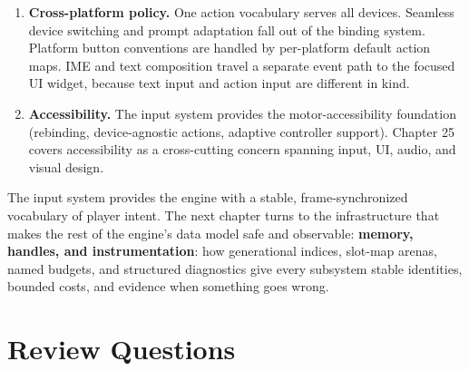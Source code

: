 \documentclass[
  11pt,
  letterpaper,
  DIV=11,
  numbers=noendperiod,
  twoside,
  open=right]{scrreprt}
\begin{document}
\begin{enumerate}
  compact, serializable, per-frame record. Combined with Chapter 4's
  deterministic fixed timestep, it provides the input-side foundation
  for replay, automated testing, and network input prediction. Chapter
  24 covers replay, recording, and determinism as a dedicated topic.
\item
  \textbf{Cross-platform policy.} One action vocabulary serves all
  devices. Seamless device switching and prompt adaptation fall out of
  the binding system. Platform button conventions are handled by
  per-platform default action maps. IME and text composition travel a
  separate event path to the focused UI widget, because text input and
  action input are different in kind.
\item
  \textbf{Accessibility.} The input system provides the
  motor-accessibility foundation (rebinding, device-agnostic actions,
  adaptive controller support). Chapter 25 covers accessibility as a
  cross-cutting concern spanning input, UI, audio, and visual design.
\end{enumerate}

The input system provides the engine with a stable, frame-synchronized
vocabulary of player intent. The next chapter turns to the
infrastructure that makes the rest of the engine's data model safe and
observable: \textbf{memory, handles, and instrumentation}: how
generational indices, slot-map arenas, named budgets, and structured
diagnostics give every subsystem stable identities, bounded costs, and
evidence when something goes wrong.

\section*{Review Questions}\label{review-questions-4}

\end{document}
